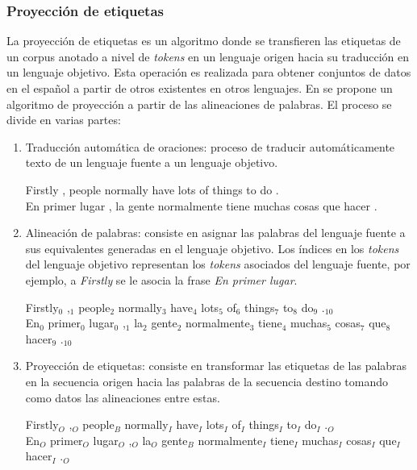 \documentclass{rcci} %
\begin{document}
\subsubsection*{Proyecci\'on de etiquetas} %

La proyecci\'on de etiquetas es un algoritmo donde se 
transfieren las etiquetas de un corpus anotado a nivel de \textit{tokens} en un lenguaje origen hacia su traducci\'on en un
lenguaje objetivo. Esta operación es realizada para obtener conjuntos de datos en el español a partir de otros 
existentes en otros lenguajes. En \citep{eger2018cross} se propone un algoritmo de proyecci\'on a partir de las alineaciones de 
palabras. El proceso se divide en varias partes:

\begin{enumerate}
	\item Traducci\'on autom\'atica de oraciones: proceso de
	traducir autom\'aticamente texto de un lenguaje fuente a un lenguaje objetivo.
	\begin{adjustwidth}{25pt}{25pt}
		Firstly , people normally have lots of things to do . \\
		En primer lugar , la gente normalmente tiene muchas cosas que hacer .
	\end{adjustwidth}
	\item Alineaci\'on de palabras: consiste en asignar las palabras del lenguaje fuente
	a sus equivalentes generadas en el lenguaje objetivo. Los índices en los \emph{tokens} del lenguaje objetivo representan 
	los \emph{tokens} asociados del lenguaje fuente, por ejemplo, a \emph{Firstly} se le asocia la frase \emph{En primer lugar}.
	\begin{adjustwidth}{25pt}{25pt}
		Firstly$_0$ ,$_1$ people$_2$ normally$_3$ have$_4$ lots$_5$ of$_6$ things$_7$ to$_8$ do$_9$ .$_{10}$ \\
		En$_0$ primer$_0$ lugar$_0$ ,$_1$ la$_2$ gente$_2$ normalmente$_3$ tiene$_4$ muchas$_5$ cosas$_7$ que$_8$ hacer$_9$ .$_{10}$
	\end{adjustwidth}
	\item Proyecci\'on de etiquetas: consiste en transformar las etiquetas de las palabras en la secuencia origen
	hacia las palabras de la secuencia destino tomando como datos las alineaciones entre estas.
	\begin{adjustwidth}{25pt}{25pt}
		Firstly$_O$ ,$_O$ people$_B$ normally$_I$ have$_I$ lots$_I$ of$_I$ things$_I$ to$_I$ do$_I$ .$_O$ \\
		En$_O$ primer$_O$ lugar$_O$ ,$_O$ la$_O$ gente$_B$ normalmente$_I$ tiene$_I$ muchas$_I$ cosas$_I$ que$_I$ hacer$_I$ .$_O$
	\end{adjustwidth}
\end{enumerate}
\end{document}
